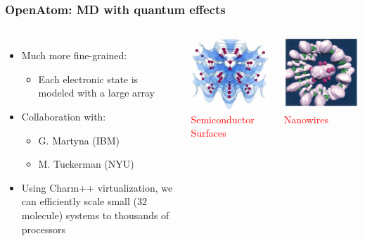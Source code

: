 \begin{frame}[t]
\frametitle{OpenAtom: MD with quantum effects}
  \begin{columns}
    \begin{itemize}
      \item Much more fine-grained:
      \begin{itemize}
        \item Each electronic state is modeled with a large array
      \end{itemize}
      \pause
      \item Collaboration with:
      \begin{itemize}
        \item G. Martyna (IBM) 
        \item M. Tuckerman (NYU)
      \end{itemize}
      \pause
    \item Using Charm++ virtualization, we can efficiently scale small (32 molecule) systems to thousands of processors
  \end{itemize}
  \begin{center} \includegraphics[width=.5\textwidth]{figures/openatom1.png}\\
  \textcolor{red}{Semiconductor Surfaces}\end{center}
  \begin{center} \includegraphics[width=.5\textwidth]{figures/openatom2.png}\\
  \textcolor{red}{Nanowires}\end{center}
  \end{columns}
\end{frame}


